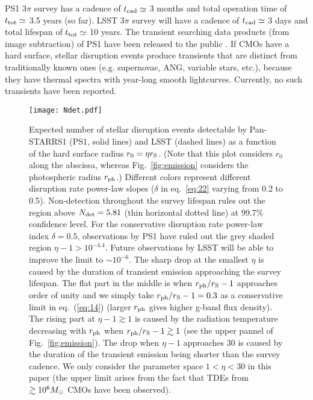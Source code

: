 \documentclass[useAMS,usenatbib]{mn2e}
\begin{document}
PS1 3$\pi$ survey has a cadence of $t_{\rm cad}\simeq$ 3 months and
total operation time of $t_{\rm tot}\simeq$ 3.5 years (so far). LSST
3$\pi$ survey will have a cadence of $t_{\rm cad}\simeq$ 3 days and total
lifespan of $t_{\rm tot}\simeq$ 10 years. The transient searching data
products (from image subtraction) of PS1 have been 
released to the public \citep{2015ATel.7153....1H,
  2016arXiv161205243F}. If CMOs have a 
hard surface, stellar disruption events produce transients that are
distinct from traditionally known ones (e.g. supernovae, ANG,
variable stars, etc.), because they have thermal spectra with
year-long smooth lightcurves. Currently, no such transients have been
reported.

\begin{figure}
  \centering
\texttt{[image: Ndet.pdf]}
\caption{Expected number of stellar disruption events detectable by
  Pan-STARRS1 (PS1, solid lines) and LSST (dashed lines) as a function of the
  hard surface radius $r_0 = \eta r_{\rm S}$. (Note that this plot
considers $r_0$ along the abscissa, whereas Fig.~\ref{fig:emission} 
considers the photospheric radius $r_{\rm ph}$.) Different colors
  represent different disruption rate power-law slopes ($\delta$ in
  eq.~\ref{eq:22} varying from 0.2 to 0.5). Non-detection throughout
  the survey lifespan rules out the region above $N_{\rm det}=5.81$
  (thin horizontal dotted line) at 99.7\% confidence level. For
  the conservative disruption rate power-law index $\delta = 0.5$,
  observations by PS1 have ruled out the grey shaded region $\eta -
  1>10^{-4.4}$. Future observations by LSST will be
  able to improve the limit to $\sim10^{-6}$.
  The sharp drop at the smallest $\eta$
  is caused by the duration of transient emission approaching the
  survey lifespan. The flat part in the middle is when $r_{\rm
  ph}/r_{\rm S} - 1$ approaches order of unity and we simply take $r_{\rm
  ph}/r_{\rm S} -1 = 0.3$ as a conservative limit in eq.~(\ref{eq:14})
  (larger $r_{\rm ph}$ gives higher g-band flux density). The rising
  part at $\eta- 1\gtrsim1$ is caused by the
  radiation temperature decreasing with $r_{\rm ph}$ when $r_{\rm
    ph}/r_{\rm S}-1 \gtrsim 1$ (see 
  the upper pannel of Fig.~\ref{fig:emission}). The drop when
  $\eta- 1$ approaches 30 is caused by the duration of the
  transient emission being shorter than the survey cadence. We only
  consider the parameter 
  space $1<\eta<30$ in this paper (the upper limit arises from the fact that TDEs from $\gtrsim
  10^6 M_{\rm \odot}$ CMOs have been observed). 
}\label{fig:Ndet}
\end{figure}
\end{document}
